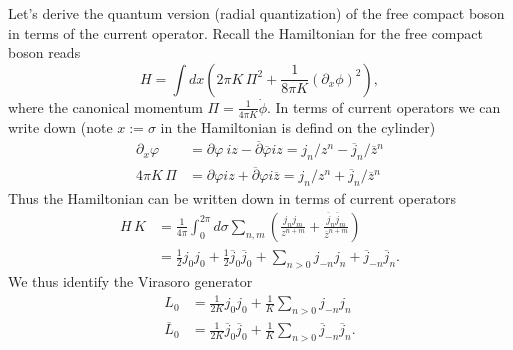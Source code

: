 \documentclass[submission, PhysLectNotes]{SciPost}
\begin{document}
Let's derive the quantum version (radial quantization) of the free compact boson in terms of the current operator. Recall the Hamiltonian for the free compact boson reads
\begin{equation}
	H = \int dx \left( 2\pi K\, \Pi^2 + \frac{1}{8\pi K} {\left(\partial_x \phi\right)}^2 \right),
\end{equation}
where the canonical momentum $\Pi = \frac{1}{4\pi K} \dot{\phi}$. In terms of current operators we can write down (note $x := \sigma$ in the Hamiltonian is defind on the cylinder)
\begin{equation}
	\begin{aligned}
		\partial_x \varphi &= \partial \varphi\ i z - \overline{\partial}\overline{\varphi} i z = j_n/z^n -\overline{j}_n / \overline{z}^n \\
		4\pi K\, \Pi &= \partial \varphi i z + \overline{\partial} \varphi i \overline{z} = j_n/z^n + \overline{j}_n / \overline{z}^n
	\end{aligned}
\end{equation}
Thus the Hamiltonian can be written down in terms of current operators
\begin{equation}
	\begin{aligned}
		H\,K &= \frac{1}{4\pi} \int_0^{2\pi} d\sigma \sum_{n,m} \left( \frac{j_n j_m}{z^{n+m}} + \frac{\overline{j}_n \overline{j}_m}{{\overline{z}}^{n+m}} \right) \\
		&= \frac{1}{2} j_0 j_0 + \frac{1}{2} \overline{j}_{0} \overline{j}_0 + \sum_{n>0} j_{-n} j_n + \overline{j}_{-n} \overline{j}_n.
	\end{aligned}
\end{equation}
We thus identify the Virasoro generator
\begin{equation}
	\begin{aligned}
		L_0 &= \frac{1}{2K} j_0 j_0 + \frac{1}{K}\sum_{n>0} j_{-n} j_n \\
		\overline{L}_0 &= \frac{1}{2K} \overline{j}_{0} \overline{j}_0 + \frac{1}{K}\sum_{n>0} \overline{j}_{-n} \overline{j}_n.
	\end{aligned}
\end{equation}
\end{document}
